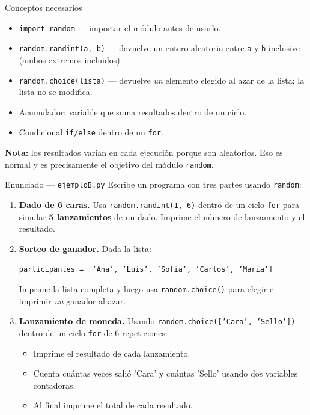 \documentclass[12pt,a4paper]{article}
\begin{document}
\vspace{0.6em}
\begin{conceptobox}{Conceptos necesarios}
\begin{itemize}
  \item \texttt{import random} — importar el módulo antes de usarlo.
  \item \texttt{random.randint(a, b)} — devuelve un entero aleatorio
        entre \texttt{a} y \texttt{b} inclusive (ambos extremos incluidos).
  \item \texttt{random.choice(lista)} — devuelve \emph{un} elemento
        elegido al azar de la lista; la lista no se modifica.
  \item Acumulador: variable que suma resultados dentro de un ciclo.
  \item Condicional \texttt{if/else} dentro de un \texttt{for}.
\end{itemize}
\end{conceptobox}

\vspace{0.5em}
\begin{notabox}
  \small\textbf{Nota:} los resultados varían en cada ejecución porque son aleatorios.
  Eso es normal y es precisamente el objetivo del módulo \texttt{random}.
\end{notabox}

\vspace{0.8em}
\begin{enunciadobox}{Enunciado — \texttt{ejemploB.py}}
Escribe un programa con tres partes usando \texttt{random}:

\begin{enumerate}
  \item \textbf{Dado de 6 caras.}
        Usa \texttt{random.randint(1, 6)} dentro de un ciclo \texttt{for}
        para simular \textbf{5 lanzamientos} de un dado.
        Imprime el número de lanzamiento y el resultado.

  \item \textbf{Sorteo de ganador.}
        Dada la lista:
        \begin{center}
          \texttt{participantes = ['Ana', 'Luis', 'Sofia', 'Carlos', 'Maria']}
        \end{center}
        Imprime la lista completa y luego usa \texttt{random.choice()}
        para elegir e imprimir \emph{un} ganador al azar.

  \item \textbf{Lanzamiento de moneda.}
        Usando \texttt{random.choice(['Cara', 'Sello'])} dentro de un
        ciclo \texttt{for} de 6 repeticiones:
        \begin{itemize}
          \item Imprime el resultado de cada lanzamiento.
          \item Cuenta cuántas veces salió 'Cara' y cuántas 'Sello'
                usando dos variables contadoras.
          \item Al final imprime el total de cada resultado.
        \end{itemize}
\end{enumerate}
\end{enunciadobox}
\end{document}
